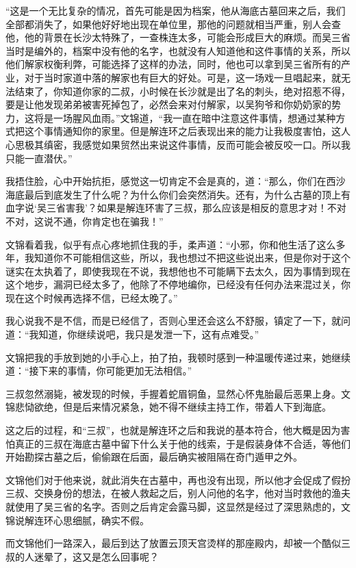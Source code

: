 “这是一个无比复杂的情况，首先可能是因为档案，他从海底古墓回来之后，我们全部都消失了，如果他好好地出现在单位里，那他的问题就相当严重，别人会查他，他的背景在长沙太特殊了，一查株连太多，可能会形成巨大的麻烦。而吴三省当时是编外的，档案中没有他的名字，也就没有人知道他和这件事情的关系，所以他们解家权衡利弊，可能选择了这样的办法，同时，他也可以拿到吴三省所有的产业，对于当时家道中落的解家也有巨大的好处。可是，这一场戏一旦唱起来，就无法结束了，你知道你家的二叔，小时候在长沙就是出了名的刺头，绝对招惹不得，要是让他发现弟弟被害死掉包了，必然会来对付解家，以吴狗爷和你奶奶家的势力，这将是一场腥风血雨。”文锦道，“我一直在暗中注意这件事情，想通过某种方式把这个事情通知你的家里。但是解连环之后表现出来的能力让我极度害怕，这人心思极其缜密，我感觉如果贸然出来说这件事情，反而可能会被反咬一口。所以我只能一直潜伏。”

我捂住脸，心中开始抗拒，感觉这一切肯定不会是真的，道：“那么，你们在西沙海底最后到底发生了什么呢？为什么你们会突然消失。还有，为什么古墓的顶上有血字说‘吴三省害我’？如果是解连环害了三叔，那么应该是相反的意思才对！不对不对，这说不通，你肯定也在骗我！”

文锦看着我，似乎有点心疼地抓住我的手，柔声道：“小邪，你和他生活了这么多年，我知道你不可能相信这些，所以，我也想过不把这些说出来，但是你对于这个谜实在太执着了，即使我现在不说，我想他也不可能瞒下去太久，因为事情到现在这个地步，漏洞已经太多了，他除了不停地编你，已经没有任何办法来混过关，你现在这个时候再选择不信，已经太晚了。”

我心说我不是不信，而是已经信了，否则心里还会这么不舒服，镇定了一下，就问道：“我知道，你继续说吧，我只是发泄一下，这有点难受。”

文锦把我的手放到她的小手心上，拍了拍，我顿时感到一种温暖传递过来，她继续道：“接下来的事情，你可能更加无法相信。”

三叔忽然溺毙，被发现的时候，手握着蛇眉铜鱼，显然心怀鬼胎最后恶果上身。文锦悲恸欲绝，但是后来情况紧急，她不得不继续主持工作，带着人下到海底。

这之后的过程，和“三叔”，也就是解连环之后和我说的基本符合，他大概是因为害怕真正的三叔在海底古墓中留下什么关于他的线索，于是假装身体不合适，等他们开始勘探古墓之后，偷偷跟在后面，最后确实被阻隔在奇门遁甲之外。

文锦他们对于他来说，就此消失在古墓中，再也没有出现，所以他才会促成了假扮三叔、交换身份的想法，在被人救起之后，别人问他的名字，他对当时救他的渔夫就使用了吴三省的名字。否则之后肯定会露马脚，这显然是经过了深思熟虑的，文锦说解连环心思细腻，确实不假。

而文锦他们一路深入，最后到达了放置云顶天宫烫样的那座殿内，却被一个酷似三叔的人迷晕了，这又是怎么回事呢？


